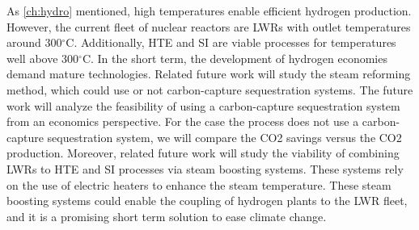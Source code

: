 As \ref{ch:hydro} mentioned, high temperatures enable efficient hydrogen production.
However, the current fleet of nuclear reactors are LWRs with outlet temperatures around 300$^{\circ}$C.
Additionally, HTE and SI are viable processes for temperatures well above 300$^{\circ}$C.
In the short term, the development of hydrogen economies demand mature technologies.
Related future work will study the steam reforming method, which could use or not carbon-capture sequestration systems.
The future work will analyze the feasibility of using a carbon-capture sequestration system from an economics perspective.
For the case the process does not use a carbon-capture sequestration system, we will compare the \gls{CO2} savings versus the \gls{CO2} production.
Moreover, related future work will study the viability of combining LWRs to HTE and SI processes via steam boosting systems.
These systems rely on the use of electric heaters to enhance the steam temperature.
These steam boosting systems could enable the coupling of hydrogen plants to the LWR fleet, and it is a promising short term solution to ease climate change.

